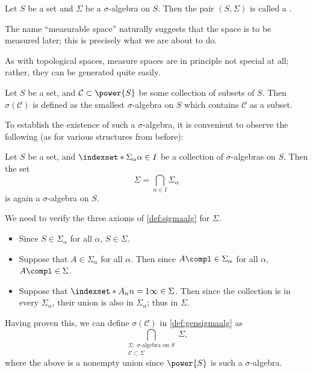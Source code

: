 \begin{definition}
    \label{def:mblspace}
    Let \(S\) be a set
    and \(\Sigma\) be a \(\sigma\)-algebra on \(S\).
    Then the pair \((S,\Sigma)\) is called
    a .
\end{definition}

The name ``measurable space'' naturally suggests that
the space is to be measured later;
this is precisely what we are about to do.

As with topological spaces,
measure spaces are in principle not special at all;
rather, they can be generated quite easily.

\begin{definition}
    \label{def:gensigmaalg}
    Let \(S\) be a set,
    and \(\mathcal C\subset\power{S}\) be some collection
    of subsets of \(S\).
    Then \(\sigma(\mathcal C)\) is defined as
    the smallest \(\sigma\)-algebra on \(S\)
    which contains \(\mathcal C\) as a subset.
\end{definition}

To establish the existence of such a \(\sigma\)-algebra,
it is convenient to observe the following
(as for various structures from before):
\begin{proposition}
    \label{prop:intersectsigma}
    Let \(S\) be a set,
    and \(\indexset*{\Sigma_\alpha}{\alpha\in I}{}\)
    be a collection of \(\sigma\)-algebras on \(S\).
    Then the set
    \[
        \Sigma
        =\bigcap_{\alpha\in I}\Sigma_\alpha
    \]
    is again a \(\sigma\)-algebra on \(S\).
\end{proposition}
\begin{myproof}
    We need to verify the three axioms of \cref{def:sigmaalg}
    for \(\Sigma\).
    \begin{itemize}
        \item Since \(S\in\Sigma_\alpha\) for all \(\alpha\),
        \(S\in\Sigma\).

        \item Suppose that \(A\in\Sigma_\alpha\) for all \(\alpha\).
        Then since \(A\compl\in\Sigma_\alpha\) for all \(\alpha\),
        \(A\compl\in\Sigma\).

        \item Suppose that \(\indexset*{A_n}{n=1}{\infty}\in\Sigma\).
        Then since the collection is in every \(\Sigma_\alpha\),
        their union is also in \(\Sigma_\alpha\);
        thus in \(\Sigma\).
        \rightqed
    \end{itemize}
\end{myproof}

Having proven this,
we can define \(\sigma(\mathcal C)\) in \cref{def:gensigmaalg} as
\[
    \bigcap_{\substack{
        \Sigma:\ \text{\(\sigma\)-algebra on \(S\)} \\
        \mathcal C\subset\Sigma}}\Sigma,
\]
where the above is a nonempty union since
\(\power{S}\) is such a \(\sigma\)-algebra.